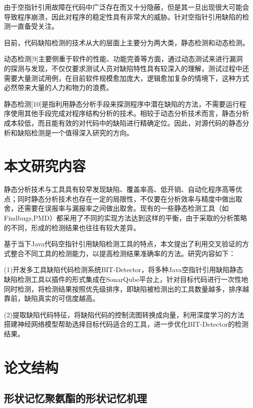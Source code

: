由于空指针引用故障在代码中广泛存在而又十分隐蔽，但是其一旦出现很大可能会导致程序崩溃，因此对程序的稳定性具有非常大的威胁。针对空指针引用缺陷的检测一直备受关注。

目前，代码缺陷检测的技术从大的层面上主要分为两大类，静态检测和动态检测。

动态检测[9]主要侧重于软件的性能、功能完善等方面，通过动态测试来进行漏洞的探测与发现，不仅仅要求测试人员对缺陷特性具有较深入的理解，测试过程中还需要大量测试用例，在目前软件规模愈加庞大，逻辑愈加复杂的情境下，这种方式必然带来大量的人力和物力的浪费。

静态检测[10]是指利用静态分析手段来探测程序中潜在缺陷的方法，不需要运行程序使用其他手段完成对程序结构分析的技术。相较于动态分析技术而言，静态分析成本较低，而且能有效的对代码中的缺陷进行精确定位。因此，对源代码的静态分析和缺陷检测是一个值得深入研究的方向。


\section{本文研究内容}
静态分析技术与工具具有较早发现缺陷、覆盖率高、低开销、自动化程序高等优点；同时静态分析技术也存在一定的局限性，不仅要在分析效率与精度中做出取舍，还需要在误报率与漏报率之间做出取舍。现有的一些静态检测工具（如Findbugs,PMD）都采用了不同的实现方法达到这样的平衡，由于采取的分析策略的不同，形成的检测结果也往往有较大差异。

基于当下Java代码空指针引用缺陷检测工具的特点，本文提出了利用交叉验证的方式整合不同工具的检测能力，以提高检测结果准确率的方法。研究内容如下：

(1)开发多工具缺陷代码检测系统BIT-Detector，将多种Java空指针引用缺陷静态缺陷检测工具以插件的形式集成在SonarQube平台上，针对目标代码进行一次性地同时检测，将检测结果按照优先级排序，即缺陷被检测出的工具数量越多，排序越靠前，缺陷真实的可信度越高。

(2)提取缺陷代码特征，将缺陷代码的控制流图转换成向量，利用深度学习的方法搭建神经网络模型帮助选择目标代码适合的工具，进一步优化BIT-Detector的检测结果。

\section{论文结构}



\subsection{形状记忆聚氨酯的形状记忆机理}

